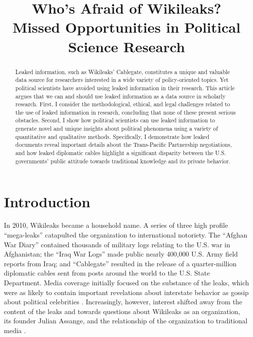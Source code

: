 \documentclass[12pt]{article}
\title{Who's Afraid of Wikileaks? \\ \vspace{2 mm} \large Missed Opportunities in Political Science Research}
\begin{document}
\maketitle

\doublespacing

\begin{abstract}
Leaked information, such as Wikileaks' Cablegate, constitutes a unique and valuable data source for researchers
interested in a wide variety of policy-oriented topics. Yet political scientists have avoided using
leaked information in their research. This article argues that we can and should use leaked information 
as a data source in scholarly research. First, I consider the
methodological, ethical, and legal challenges related to the use of leaked information in research, concluding 
that none of these present serious obstacles. 
Second, I show how political scientists can use leaked information to generate novel and unique 
insights about political phenomena using a variety of quantitative and qualitative methods. Specifically, 
I demonstrate how leaked documents reveal important details about the Trans-Pacific Partnership 
negotiations, and how leaked diplomatic cables highlight a significant disparity between the U.S. governments' 
public attitude towards traditional knowledge and its private behavior.
\end{abstract}

\section{Introduction}

In 2010, Wikileaks became a household name. A series of three high profile ``mega-leaks'' 
catapulted the organization to international notoriety.
The ``Afghan War Diary'' contained thousands of military logs relating to the U.S. war in Afghanistan;
the ``Iraq War Logs'' made public nearly 400,000 U.S. 
Army field reports from Iraq; and ``Cablegate'' resulted in the release of a quarter-million 
diplomatic cables sent from posts around the world to the U.S. State Department.
Media coverage initially focused on the substance of the leaks, which were as likely to contain 
important revelations about interstate behavior as gossip about political celebrities \citep{shane2010wikileaks,hooper2010silvio}.
Increasingly, however, interest shifted away from the content of the leaks and towards questions 
about Wikileaks as an organization, its founder Julian Assange, and the relationship of the organization 
to traditional media \citep{saunders2011wikileaks,benkler2011free}.
\end{document}
